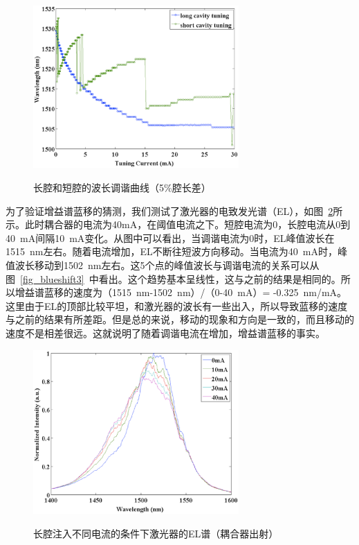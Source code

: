 \documentclass{ZJUthesis}
\begin{document}
\begin{figure}[htbp]
  \centering
  \includegraphics[width=0.7\textwidth]{./Pictures/blueshift.eps}\\
  \caption{长腔和短腔的波长调谐曲线（5\%腔长差）}
  \label{fig_blueshift}
\end{figure}

为了验证增益谱蓝移的猜测，我们测试了激光器的电致发光谱（EL），如图~\ref{fig_blueshift2}所示。此时耦合器的电流为40mA，在阈值电流之下。短腔电流为0，长腔电流从0到40~mA间隔10~mA变化。从图中可以看出，当调谐电流为0时，EL峰值波长在1515~nm左右。随着电流增加，EL不断往短波方向移动。当电流为40~mA时，峰值波长移动到1502~nm左右。这5个点的峰值波长与调谐电流的关系可以从图~\ref{fig_blueshift3}~中看出。这个趋势基本呈线性，这与之前的结果是相同的。所以增益谱蓝移的速度为（1515~nm-1502~nm）/（0-40~mA）= -0.325~nm/mA。这里由于EL的顶部比较平坦，和激光器的波长有一些出入，所以导致蓝移的速度与之前的结果有所差距。但是总的来说，移动的现象和方向是一致的，而且移动的速度不是相差很远。这就说明了随着调谐电流在增加，增益谱蓝移的事实。

\begin{figure}[htbp]
  \centering
  \includegraphics[width=0.7\textwidth]{./Pictures/blueshift2.eps}\\
  \caption{长腔注入不同电流的条件下激光器的EL谱（耦合器出射）}
  \label{fig_blueshift2}
\end{figure}
\end{document}
